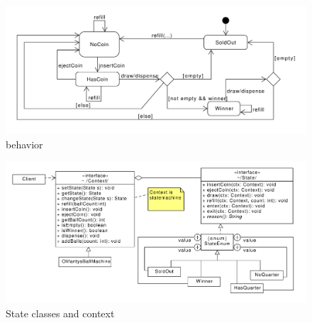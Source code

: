 \begin{figure}[htbp]\centering
  \includegraphics[width=.9\linewidth]{figures/statemachine}
  \caption{\label{behavior}behavior}
\end{figure}

\begin{figure}[htbp]\centering
  \includegraphics[width=.9\linewidth]{figures/context}
  \caption{\label{classdiagram}State classes and context}
\end{figure}

\label{LastPage}

